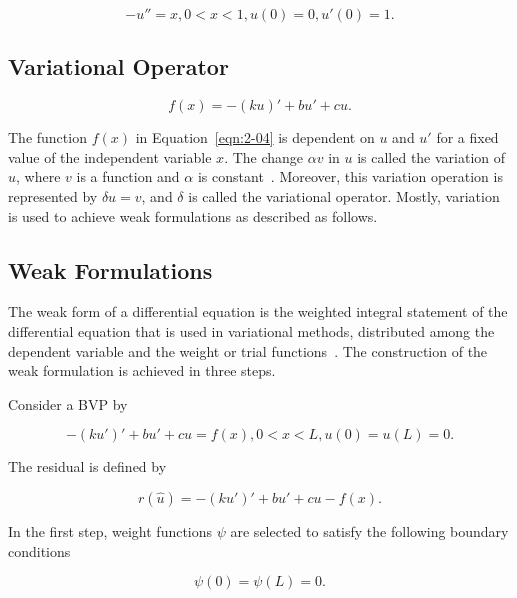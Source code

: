 \begin{equation}
-u'' = x,  0 < x < 1, u(0) = 0, u'(0) = 1.
\label{eqn:2-03}
\end{equation}

\subsection{Variational Operator}

\begin{equation}
f(x) = -(ku)' + bu' + cu.
\label{eqn:2-04}
\end{equation}

The function $f(x)$ in Equation~\ref{eqn:2-04} is dependent on $u$ and $u'$ for a fixed value of the independent variable $x$. The change $\alpha v$ in $u$ is called the variation of $u$, where $v$ is a function and $\alpha$ is constant~\cite{Reddy02}. Moreover, this variation operation is represented by $\delta u = v$, and $\delta$ is called the variational operator. Mostly, variation is used to achieve weak formulations as described as follows.

\subsection{Weak Formulations}

The weak form of a differential equation is the weighted integral statement of the differential equation that is used in variational methods, distributed among the dependent variable and the weight or trial functions~\cite{Reddy93}. The construction of the weak formulation is achieved in three steps.

Consider a BVP by

\begin{equation}
-(ku')' + bu' + cu = f(x), 0 < x < L, u(0) = u(L) = 0.
\label{eqn:2-05}
\end{equation}

\noindent The residual is defined by

\begin{equation}
r(\hat{u}) = -(ku')' + bu' + cu - f(x).
\label{eqn:2-06}
\end{equation}

\noindent In the first step, weight functions $\psi$ are selected to satisfy the following boundary conditions

\begin{equation}
\psi(0) = \psi(L) = 0.
\label{eqn:2-07}
\end{equation}

